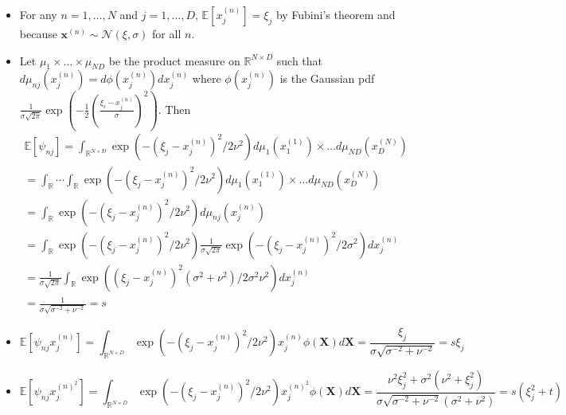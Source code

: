         \begin{itemize}
            \item For any $n=1,\ldots,N$ and $j=1,\ldots, D$, $\mathds{E}[x^{(n)}_j] = \xi_j$ by Fubini's theorem and because $\mathbf{x}^{(n)} \sim \mathcal{N}(\xi,\sigma)$ for all $n$.
            \item Let $\mu_1 \times \ldots \times \mu_{ND}$ be the product measure on $\mathbb{R}^{N\times D}$ such that $d\mu_{nj}(x^{(n)}_j) = d\phi(x^{(n)}_j)dx^{(n)}_j$ where $\phi(x^{(n)}_j)$ is the Gaussian pdf $\frac{1}{\sigma \sqrt{2\pi}}\exp\left(-\frac{1}{2}\left(\frac{\xi_i-x^{(n)}_j}{\sigma}\right)^2\right)$. Then 
            \begin{align*}
            \mathds{E}[\psi_{nj}] = \int_{\mathbb{R}^{N\times D}} \exp(-(\xi_j - x^{(n)}_j)^2/2\nu^2) d\mu_1(x^{(1)}_1) \times \ldots d\mu_{ND}(x^{(N)}_D) \\
            = \int_\mathbb{R} \cdots \int_\mathbb{R} \exp(-(\xi_j - x^{(n)}_j)^2/2\nu^2) d\mu_1(x^{(1)}_1) \times \ldots d\mu_{ND}(x^{(N)}_D) \\ 
            = \int_\mathbb{R}\exp(-(\xi_j - x^{(n)}_j)^2/2\nu^2) d\mu_{nj}(x^{(n)}_j) \\
            = \int_\mathbb{R}\exp(-(\xi_j - x^{(n)}_j)^2/2\nu^2) \frac{1}{\sigma \sqrt{2\pi}}\exp\left(-(\xi_j-x^{(n)}_j)^2/2\sigma^2\right) dx^{(n)}_j \\
            = \frac{1}{\sigma \sqrt{2\pi}} \int_\mathbb{R} \exp\left((\xi_j - x^{(n)}_j)^2(\sigma^2 + \nu^2)/2\sigma^2 \nu^2\right) dx^{(n)}_j\\
            =\frac{1}{\sigma \sqrt{\sigma^{-2} + \nu^{-2}}}=s
            \end{align*}
            \item \[\mathds{E}[\psi_{nj}x^{(n)}_j] = \int_{\mathbb{R}^{N\times D}} \exp(-(\xi_j - x^{(n)}_j)^2/2\nu^2) x^{(n)}_j \phi(\mathbf{X}) d\mathbf{X} = \frac{\xi_j}{\sigma \sqrt{\sigma^{-2} +\nu^{-2}}}=s \xi_j\]
            \item \[\mathds{E}[\psi_{nj} x^{{(n)}^2}_j]= \int_{\mathbb{R}^{N\times D}} \exp(-(\xi_j - x^{(n)}_j)^2/2\nu^2) x^{{(n)}^2}_j \phi(\mathbf{X}) d\mathbf{X} = \frac{\nu^2 \xi_j^2 + \sigma^2(\nu^2+\xi_j^2)}{\sigma\sqrt{\sigma^{-2} + \nu^{-2}}(\sigma^2+\nu^2)}=s(\xi_j^2+t)\]
        \end{itemize}

